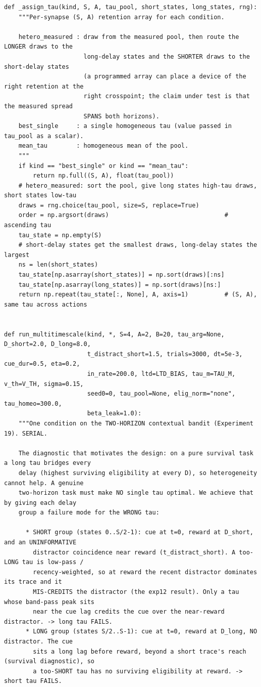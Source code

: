 \begin{lstlisting}[caption={mrl\_trace/extensions.py},label={lst:siox-src-extensions}]
def _assign_tau(kind, S, A, tau_pool, short_states, long_states, rng):
    """Per-synapse (S, A) retention array for each condition.

    hetero_measured : draw from the measured pool, then route the LONGER draws to the
                      long-delay states and the SHORTER draws to the short-delay states
                      (a programmed array can place a device of the right retention at the
                      right crosspoint; the claim under test is that the measured spread
                      SPANS both horizons).
    best_single     : a single homogeneous tau (value passed in tau_pool as a scalar).
    mean_tau        : homogeneous mean of the pool.
    """
    if kind == "best_single" or kind == "mean_tau":
        return np.full((S, A), float(tau_pool))
    # hetero_measured: sort the pool, give long states high-tau draws, short states low-tau
    draws = rng.choice(tau_pool, size=S, replace=True)
    order = np.argsort(draws)                                # ascending tau
    tau_state = np.empty(S)
    # short-delay states get the smallest draws, long-delay states the largest
    ns = len(short_states)
    tau_state[np.asarray(short_states)] = np.sort(draws)[:ns]
    tau_state[np.asarray(long_states)] = np.sort(draws)[ns:]
    return np.repeat(tau_state[:, None], A, axis=1)          # (S, A), same tau across actions


def run_multitimescale(kind, *, S=4, A=2, B=20, tau_arg=None, D_short=2.0, D_long=8.0,
                       t_distract_short=1.5, trials=3000, dt=5e-3, cue_dur=0.5, eta=0.2,
                       in_rate=200.0, ltd=LTD_BIAS, tau_m=TAU_M, v_th=V_TH, sigma=0.15,
                       seed0=0, tau_pool=None, elig_norm="none", tau_homeo=300.0,
                       beta_leak=1.0):
    """One condition on the TWO-HORIZON contextual bandit (Experiment 19). SERIAL.

    The diagnostic that motivates the design: on a pure survival task a long tau bridges every
    delay (highest surviving eligibility at every D), so heterogeneity cannot help. A genuine
    two-horizon task must make NO single tau optimal. We achieve that by giving each delay
    group a failure mode for the WRONG tau:

      * SHORT group (states 0..S/2-1): cue at t=0, reward at D_short, and an UNINFORMATIVE
        distractor coincidence near reward (t_distract_short). A too-LONG tau is low-pass /
        recency-weighted, so at reward the recent distractor dominates its trace and it
        MIS-CREDITS the distractor (the exp12 result). Only a tau whose band-pass peak sits
        near the cue lag credits the cue over the near-reward distractor. -> long tau FAILS.
      * LONG group (states S/2..S-1): cue at t=0, reward at D_long, NO distractor. The cue
        sits a long lag before reward, beyond a short trace's reach (survival diagnostic), so
        a too-SHORT tau has no surviving eligibility at reward. -> short tau FAILS.


\end{lstlisting}
